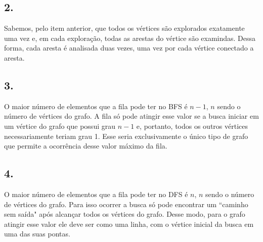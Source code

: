 \documentclass[a4paper,openright, 12pt]{article}
\begin{document}
\subsection*{2.}
Sabemos, pelo item anterior, que todos os vértices são explorados exatamente uma vez e, em cada exploração, todas as arestas do vértice são examindas. Dessa forma, cada aresta é analisada duas vezes, uma vez por cada vértice conectado a aresta.

\subsection*{3.}
O maior número de elementos que a fila pode ter no BFS é $n-1$, $n$ sendo o número de vértices do grafo. A fila só pode atingir esse valor se a busca iniciar em um vértice do grafo que possui grau $n-1$ e, portanto, todos os outros vértices necessariamente teriam grau 1. Esse seria exclusivamente o único tipo de grafo que permite a ocorrência desse valor máximo da fila.

\subsection*{4.}
O maior número de elementos que a fila pode ter no DFS é $n$, $n$ sendo o número de vértices do grafo. Para isso ocorrer a busca só pode encontrar um ``caminho sem saída" após alcançar todos os vértices do grafo. Desse modo, para o grafo atingir esse valor ele deve ser como uma linha, com o vértice inicial da busca em uma das suas pontas. 
\end{document}
